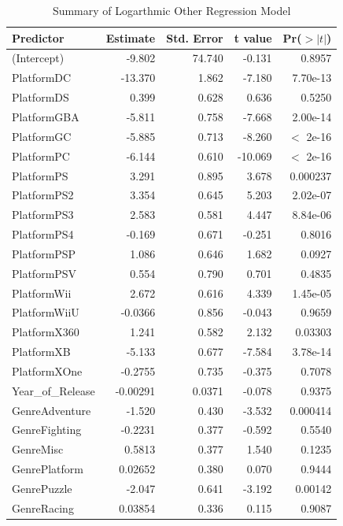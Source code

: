 \documentclass[12pt]{article}
\begin{document}
\begin{table}[ht]
  \caption{Summary of Logarthmic Other Regression Model}
  \label{tab:logother}
  \centering
  \begin{tabular}{lrrrr}
    \hline
    Predictor & Estimate & Std. Error & t value & Pr($>|t|$) \\
    \hline
    (Intercept) & -9.802 & 74.740 & -0.131 & 0.8957 \\
    PlatformDC & -13.370 & 1.862 & -7.180 & 7.70e-13 \\
    PlatformDS & 0.399 & 0.628 & 0.636 & 0.5250 \\
    PlatformGBA & -5.811 & 0.758 & -7.668 & 2.00e-14 \\
    PlatformGC & -5.885 & 0.713 & -8.260 & $<$ 2e-16 \\
    PlatformPC & -6.144 & 0.610 & -10.069 & $<$ 2e-16 \\
    PlatformPS & 3.291 & 0.895 & 3.678 & 0.000237 \\
    PlatformPS2 & 3.354 & 0.645 & 5.203 & 2.02e-07 \\
    PlatformPS3 & 2.583 & 0.581 & 4.447 & 8.84e-06 \\
    PlatformPS4 & -0.169 & 0.671 & -0.251 & 0.8016 \\
    PlatformPSP & 1.086 & 0.646 & 1.682 & 0.0927 \\
    PlatformPSV & 0.554 & 0.790 & 0.701 & 0.4835 \\
    PlatformWii & 2.672 & 0.616 & 4.339 & 1.45e-05 \\
    PlatformWiiU & -0.0366 & 0.856 & -0.043 & 0.9659 \\
    PlatformX360 & 1.241 & 0.582 & 2.132 & 0.03303 \\
    PlatformXB & -5.133 & 0.677 & -7.584 & 3.78e-14 \\
    PlatformXOne & -0.2755 & 0.735 & -0.375 & 0.7078 \\
    Year\_of\_Release & -0.00291 & 0.0371 & -0.078 & 0.9375 \\
    GenreAdventure & -1.520 & 0.430 & -3.532 & 0.000414 \\
    GenreFighting & -0.2231 & 0.377 & -0.592 & 0.5540 \\
    GenreMisc & 0.5813 & 0.377 & 1.540 & 0.1235 \\
    GenrePlatform & 0.02652 & 0.380 & 0.070 & 0.9444 \\
    GenrePuzzle & -2.047 & 0.641 & -3.192 & 0.00142 \\
    GenreRacing & 0.03854 & 0.336 & 0.115 & 0.9087 \\

\end{tabular}
\end{table}
\end{document}

